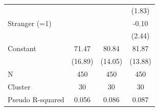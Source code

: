 {\begin{tabular}{l*{3}{c}}
                    &                     &                     &      (1.83)         \\
Stranger (=1)       &                     &                     &       -0.10         \\
                    &                     &                     &      (2.44)         \\
Constant            &       71.47\sym{***}&       80.84\sym{***}&       81.87\sym{***}\\
                    &     (16.89)         &     (14.05)         &     (13.88)         \\
\midrule
N                   &         450         &         450         &         450         \\
Cluster             &          30         &          30         &          30         \\
Pseudo R-squared    &       0.056         &       0.086         &       0.087         \\
\bottomrule
\end{tabular}
}
